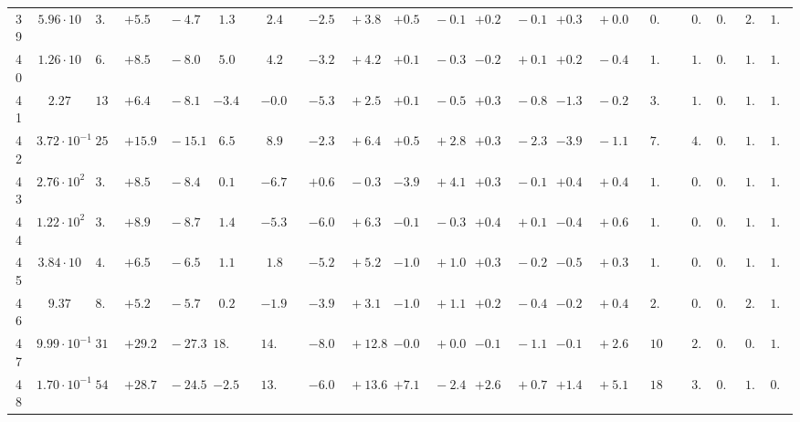 \documentclass[12pt]{article}
\begin{document}
\begin{table}
\begin{tabular}{ccrr@{\hskip0pt}rrc@{\hskip0pt}r@{\hskip0pt}c@{\hskip0pt}r@{\hskip0pt}rr@{\hskip0pt}rr@{\hskip0pt}rr@{\hskip0pt}rr@{\hskip0pt}r@{\hskip0pt}r@{\hskip0pt}c|rr|r}
39 &$5.96 \cdot 10$ &$ 3.2$  & ${+5.5~}$&${~-4.7}$ & $ 1.3$  & &$ 2.4$&&${-2.5~}$&${~+3.8}$ & ${+0.5~}$&${~-0.1}$ & ${+0.2~}$&${~-0.1}$ & ${+0.3~}$&${~+0.0}$ & &$ 0.8$&&$ 0.3$  & $0.96$  & $ 2.1$  & $1.01$   \\ 
40 &$1.26 \cdot 10$ &$ 6.3$  & ${+8.5~}$&${~-8.0}$ & $ 5.0$  & &$ 4.2$&&${-3.2~}$&${~+4.2}$ & ${+0.1~}$&${~-0.3}$ & ${-0.2~}$&${~+0.1}$ & ${+0.2~}$&${~-0.4}$ & &$ 1.4$&&$ 1.5$  & $0.96$  & $ 1.8$  & $1.03$   \\ 
41 &$2.27$ &$13.7$  & ${+6.4~}$&${~-8.1}$ & $-3.4$  & &$-0.0$&&${-5.3~}$&${~+2.5}$ & ${+0.1~}$&${~-0.5}$ & ${+0.3~}$&${~-0.8}$ & ${-1.3~}$&${~-0.2}$ & &$ 3.6$&&$ 1.5$  & $0.96$  & $ 1.3$  & $1.02$   \\ 
42 &$3.72 \cdot 10^{-1}$ &$25.0$  & ${+15.9~}$&${~-15.1}$ & $ 6.5$  & &$ 8.9$&&${-2.3~}$&${~+6.4}$ & ${+0.5~}$&${~+2.8}$ & ${+0.3~}$&${~-2.3}$ & ${-3.9~}$&${~-1.1}$ & &$ 7.6$&&$ 4.2$  & $0.95$  & $ 1.2$  & $1.03$   \\ 
43 &$2.76 \cdot 10^{2}$ &$ 3.9$  & ${+8.5~}$&${~-8.4}$ & $ 0.1$  & &$-6.7$&&${+0.6~}$&${~-0.3}$ & ${-3.9~}$&${~+4.1}$ & ${+0.3~}$&${~-0.1}$ & ${+0.4~}$&${~+0.4}$ & &$ 1.4$&&$ 0.6$  & $0.89$  & $ 1.3$  & $1.03$   \\ 
44 &$1.22 \cdot 10^{2}$ &$ 3.7$  & ${+8.9~}$&${~-8.7}$ & $ 1.4$  & &$-5.3$&&${-6.0~}$&${~+6.3}$ & ${-0.1~}$&${~-0.3}$ & ${+0.4~}$&${~+0.1}$ & ${-0.4~}$&${~+0.6}$ & &$ 1.2$&&$ 0.4$  & $0.95$  & $ 1.2$  & $1.02$   \\ 
45 &$3.84 \cdot 10$ &$ 4.9$  & ${+6.5~}$&${~-6.5}$ & $ 1.1$  & &$ 1.8$&&${-5.2~}$&${~+5.2}$ & ${-1.0~}$&${~+1.0}$ & ${+0.3~}$&${~-0.2}$ & ${-0.5~}$&${~+0.3}$ & &$ 1.3$&&$ 0.4$  & $0.96$  & $ 1.8$  & $1.00$   \\ 
46 &$9.37$ &$ 8.5$  & ${+5.2~}$&${~-5.7}$ & $ 0.2$  & &$-1.9$&&${-3.9~}$&${~+3.1}$ & ${-1.0~}$&${~+1.1}$ & ${+0.2~}$&${~-0.4}$ & ${-0.2~}$&${~+0.4}$ & &$ 2.0$&&$ 0.7$  & $0.96$  & $ 2.0$  & $1.01$   \\ 
47 &$9.99 \cdot 10^{-1}$ &$31.3$  & ${+29.2~}$&${~-27.3}$ & $18.4$  & &$14.9$&&${-8.0~}$&${~+12.8}$ & ${-0.0~}$&${~+0.0}$ & ${-0.1~}$&${~-1.1}$ & ${-0.1~}$&${~+2.6}$ & &$10.4$&&$ 2.9$  & $0.96$  & $ 0.9$  & $1.03$   \\ 
48 &$1.70 \cdot 10^{-1}$ &$54.7$  & ${+28.7~}$&${~-24.5}$ & $-2.5$  & &$13.2$&&${-6.0~}$&${~+13.6}$ & ${+7.1~}$&${~-2.4}$ & ${+2.6~}$&${~+0.7}$ & ${+1.4~}$&${~+5.1}$ & &$18.8$&&$ 3.5$  & $0.95$  & $ 1.8$  & $0.99$   \\ 
\hline
\hline
\end{tabular}


\end{table}
\end{document}
